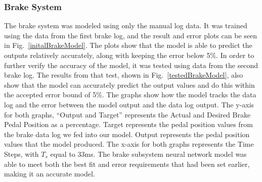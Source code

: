 \documentclass[conference]{IEEEtran}
\begin{document}
\subsubsection{Brake System}

The brake system was modeled using only the manual log data. It was trained using the data from the first brake log, and the result and error plots can be seen in Fig.~\ref{initalBrakeModel}. The plots show that the model is able to predict the outputs relatively accurately, along with keeping the error below 5\%. In order to further verify the accuracy of the model, it was tested using data from the second brake log. The results from that test, shown in Fig.~\ref{testedBrakeModel}, also show that the model can accurately predict the output values and do this within the accepted error bound of 5\%. The graphs show how the model tracks the data log and the error between the model output and the data log output. The y-axis for both graphs, “Output and Target” represents the Actual and Desired Brake Pedal Position as a percentage. Target represents the pedal position values from the brake data log we fed into our model. Output represents the pedal position values that the model produced. The x-axis for both graphs represents the Time Steps, with $T_s$ equal to 33ms. The brake subsystem neural network model was able to meet both the best fit and error requirements that had been set earlier, making it an accurate model. 
\end{document}
